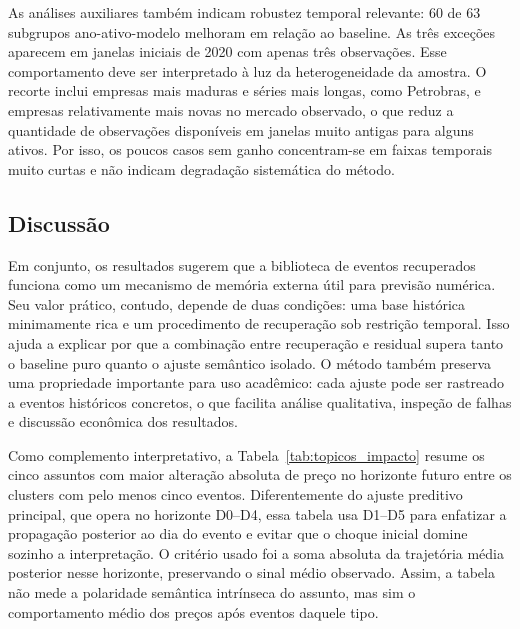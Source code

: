\documentclass[conference]{IEEEtran}
\begin{document}
As análises auxiliares também indicam robustez temporal relevante: 60 de 63 subgrupos ano-ativo-modelo melhoram em relação ao baseline. As três exceções aparecem em janelas iniciais de 2020 com apenas três observações. Esse comportamento deve ser interpretado à luz da heterogeneidade da amostra. O recorte inclui empresas mais maduras e séries mais longas, como Petrobras, e empresas relativamente mais novas no mercado observado, o que reduz a quantidade de observações disponíveis em janelas muito antigas para alguns ativos. Por isso, os poucos casos sem ganho concentram-se em faixas temporais muito curtas e não indicam degradação sistemática do método.

\subsection{Discussão}

Em conjunto, os resultados sugerem que a biblioteca de eventos recuperados funciona como um mecanismo de memória externa útil para previsão numérica. Seu valor prático, contudo, depende de duas condições: uma base histórica minimamente rica e um procedimento de recuperação sob restrição temporal. Isso ajuda a explicar por que a combinação entre recuperação e residual supera tanto o baseline puro quanto o ajuste semântico isolado. O método também preserva uma propriedade importante para uso acadêmico: cada ajuste pode ser rastreado a eventos históricos concretos, o que facilita análise qualitativa, inspeção de falhas e discussão econômica dos resultados.

Como complemento interpretativo, a Tabela~\ref{tab:topicos_impacto} resume os cinco assuntos com maior alteração absoluta de preço no horizonte futuro entre os clusters com pelo menos cinco eventos. Diferentemente do ajuste preditivo principal, que opera no horizonte D0--D4, essa tabela usa D1--D5 para enfatizar a propagação posterior ao dia do evento e evitar que o choque inicial domine sozinho a interpretação. O critério usado foi a soma absoluta da trajetória média posterior nesse horizonte, preservando o sinal médio observado. Assim, a tabela não mede a polaridade semântica intrínseca do assunto, mas sim o comportamento médio dos preços após eventos daquele tipo.
\end{document}
